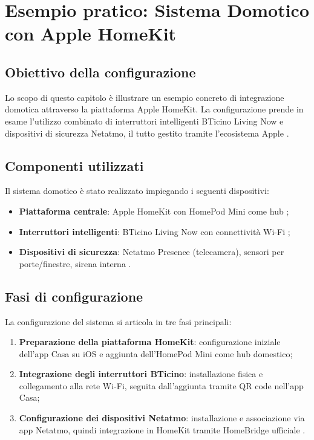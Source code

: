\chapter{Esempio pratico: Sistema Domotico con Apple HomeKit}
\section{Obiettivo della configurazione}
Lo scopo di questo capitolo è illustrare un esempio concreto di integrazione domotica attraverso la piattaforma Apple HomeKit. La configurazione prende in esame l’utilizzo combinato di interruttori intelligenti BTicino Living Now e dispositivi di sicurezza Netatmo, il tutto gestito tramite l’ecosistema Apple \parencite{appleHomekit}.

\section{Componenti utilizzati}
Il sistema domotico è stato realizzato impiegando i seguenti dispositivi:
\begin{itemize}
    \item \textbf{Piattaforma centrale}: Apple HomeKit con HomePod Mini come hub \parencite{appleHomepod};
    \item \textbf{Interruttori intelligenti}: BTicino Living Now con connettività Wi-Fi \parencite{bticino};
    \item \textbf{Dispositivi di sicurezza}: Netatmo Presence (telecamera), sensori per porte/finestre, sirena interna \parencite{netatmo}.
\end{itemize}

\section{Fasi di configurazione}
La configurazione del sistema si articola in tre fasi principali:
\begin{enumerate}
    \item \textbf{Preparazione della piattaforma HomeKit}: configurazione iniziale dell’app Casa su iOS e aggiunta dell’HomePod Mini come hub domestico;
    \item \textbf{Integrazione degli interruttori BTicino}: installazione fisica e collegamento alla rete Wi-Fi, seguita dall’aggiunta tramite QR code nell’app Casa;
    \item \textbf{Configurazione dei dispositivi Netatmo}: installazione e associazione via app Netatmo, quindi integrazione in HomeKit tramite HomeBridge ufficiale \parencite{homebridge}.
\end{enumerate}


